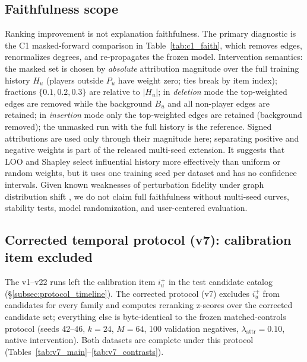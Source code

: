 \documentclass[pdflatex,sn-mathphys-num]{sn-jnl}
\begin{document}
\subsection{Faithfulness scope}\label{sec:explainability}
Ranking improvement is not explanation faithfulness. The primary diagnostic is the C1 masked-forward comparison in Table~\ref{tab:c1_faith}, which removes edges, renormalizes degrees, and re-propagates the frozen model. Intervention semantics: the masked set is chosen by \emph{absolute} attribution magnitude over the full training history $H_u$ (players outside $P_u$ have weight zero; ties break by item index); fractions $\{0.1,0.2,0.3\}$ are relative to $|H_u|$; in \emph{deletion} mode the top-weighted edges are removed while the background $B_u$ and all non-player edges are retained; in \emph{insertion} mode only the top-weighted edges are retained (background removed); the unmasked run with the full history is the reference. Signed attributions are used only through their magnitude here; separating positive and negative weights is part of the released multi-seed extension. It suggests that LOO and Shapley select influential history more effectively than uniform or random weights, but it uses one training seed per dataset and has no confidence intervals. Given known weaknesses of perturbation fidelity under graph distribution shift \cite{zheng2024robust,fang2023evaluating}, we do not claim full faithfulness without multi-seed curves, stability tests, model randomization, and user-centered evaluation.
\subsection{Corrected temporal protocol (v7): calibration item excluded}\label{subsec:v7_protocol}

The v1--v22 runs left the calibration item $i_u^+$ in the test candidate catalog (\S\ref{subsec:protocol_timeline}). The corrected protocol (v7) excludes $i_u^+$ from candidates for every family and computes reranking z-scores over the corrected candidate set; everything else is byte-identical to the frozen matched-controls protocol (seeds 42--46, $k=24$, $M=64$, 100 validation negatives, $\lambda_{\mathrm{attr}}=0.10$, native intervention). Both datasets are complete under this protocol (Tables~\ref{tab:v7_main}--\ref{tab:v7_contrasts}).
\end{document}
